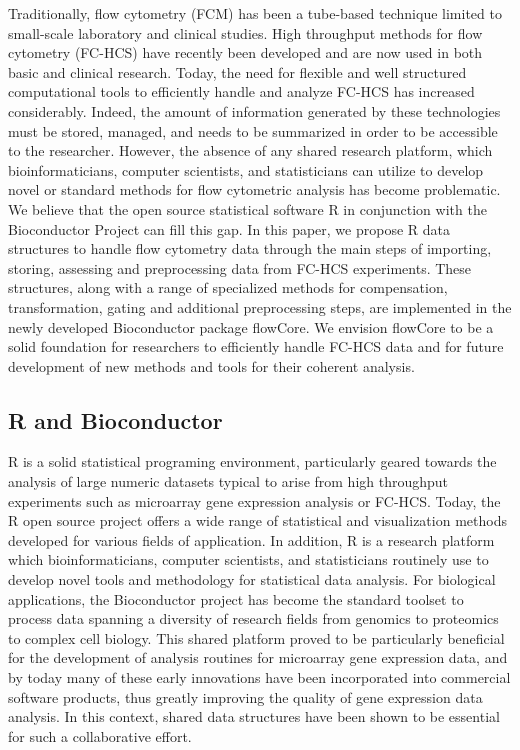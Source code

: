 \documentclass[12pt]{article}
\begin{document}
Traditionally, flow cytometry (FCM) has been a tube-based technique
limited to small-scale laboratory and clinical studies.  High
throughput methods for flow cytometry (FC-HCS) have recently been
developed and are now used in both basic and clinical research. Today,
the need for flexible and well structured computational tools to
efficiently handle and analyze FC-HCS has increased
considerably. Indeed, the amount of information generated by these
technologies must be stored, managed, and needs to be summarized in
order to be accessible to the researcher. However, the absence of any
shared research platform, which bioinformaticians, computer scientists,
and statisticians can utilize to develop novel or standard methods for
flow cytometric analysis has become problematic. We believe that the open
source statistical software R in conjunction with the Bioconductor
Project can fill this gap.  In this paper, we propose R data
structures to handle flow cytometry data through the main steps of
importing, storing, assessing and preprocessing data from FC-HCS
experiments. These structures, along with a range of specialized
methods for compensation, transformation, gating and additional
preprocessing steps, are implemented in the newly developed
Bioconductor package flowCore.  We envision flowCore to be a solid
foundation for researchers to efficiently handle FC-HCS data and for
future development of new methods and tools for their coherent
analysis.


\subsection*{R and Bioconductor}
R is a solid statistical programing environment, particularly geared
towards the analysis of large numeric datasets typical to arise from
high throughput experiments such as microarray gene expression
analysis or FC-HCS. Today, the R open source project offers a wide
range of statistical and visualization methods developed for various
fields of application. In addition, R is a research platform which
bioinformaticians, computer scientists, and statisticians routinely
use to develop novel tools and methodology for statistical data
analysis. For biological applications, the Bioconductor project has
become the standard toolset \citep{gentleman2006bos} to process data
spanning a diversity of research fields from genomics to proteomics to
complex cell biology. This shared platform proved to be particularly
beneficial for the development of analysis routines for microarray
gene expression data, and by today many of these early innovations
have been incorporated into commercial software products, thus greatly
improving the quality of gene expression data analysis. In this
context, shared data structures have been shown to be essential for
such a collaborative effort.
\end{document}
